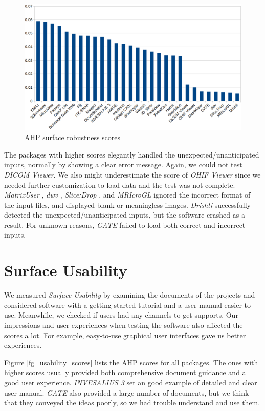\begin{figure}[H]
\includegraphics[scale=0.38]{figures/robustness_scores.png}
\caption{AHP surface robustness scores}
\label{fg_robustness_scores}
\end{figure}

The packages with higher scores elegantly handled the unexpected/unanticipated inputs, normally by showing a clear error message. Again, we could not test \textit{DICOM Viewer}. We also might underestimate the score of \textit{OHIF Viewer} \cite{Ziegler2020} since we needed further customization to load data and the test was not complete. \textit{MatrixUser} \cite{Liu2016}, \textit{dwv} \cite{Martelli2021}, \textit{Slice:Drop} \cite{Haehn2013}, and \textit{MRIcroGL} \cite{Rorden2021} ignored the incorrect format of the input files, and displayed blank or meaningless images. \textit{Drishti} successfully detected the unexpected/unanticipated inputs, but the software crashed as a result. For unknown reasons, \textit{GATE} failed to load both correct and incorrect inputs.

\section{Surface Usability}
We measured \textit{Surface Usability} by examining the documents of the projects and considered software with a getting started tutorial and a user manual easier to use. Meanwhile, we checked if users had any channels to get supports. Our impressions and user experiences when testing the software also affected the scores a lot. For example, easy-to-use graphical user interfaces gave us better experiences.

Figure \ref{fg_usability_scores} lists the AHP scores for all packages. The ones with higher scores usually provided both comprehensive document guidance and a good user experience. \textit{INVESALIUS 3} \cite{Amorim2015} set an good example of detailed and clear user manual. \textit{GATE} also provided a large number of documents, but we think that they conveyed the ideas poorly, so we had trouble understand and use them.

